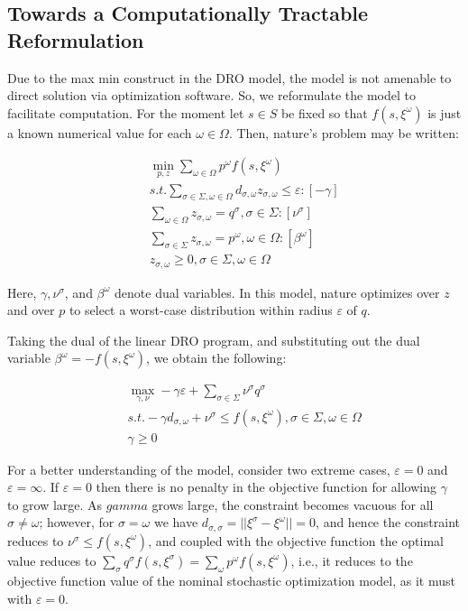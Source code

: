 \subsection{Towards a Computationally Tractable Reformulation}
\label{subsec:TractableReformulation}
Due to the max min construct in the DRO model, the model is not amenable to direct solution
via optimization software. So, we reformulate the model to facilitate computation.
For the moment let $s\in S$ be fixed so that $f(s, \xi^\omega)$ is just a known numerical
value for each $\omega \in \Omega$. Then, nature’s problem may be written:

\begin{subequations}
\begin{eqnarray}
& & \min_{p, z} \sum_{\omega \in \Omega} p^\omega f(s, \xi^\omega) \\
& & s.t. \sum_{\sigma \in \Sigma, \omega \in \Omega} d_{\sigma, \omega} z_{\sigma, \omega} \le \varepsilon : [-\gamma] \\
& & \sum_{\omega \in \Omega} z_{\sigma, \omega} = q^\sigma, \sigma \in \Sigma : [\nu^\sigma]\\
& & \sum_{\sigma \in \Sigma} z_{\sigma, \omega} = p^\omega, \omega \in \Omega : [\beta^\omega]\\
& & z_{\sigma, \omega} \ge 0, \sigma \in \Sigma, \omega \in \Omega
\end{eqnarray}
\end{subequations}

Here, $\gamma, \nu^\sigma$, and $\beta^\omega$ denote dual variables.
In this model, nature optimizes over $z$ and over $p$ to select a worst-case distribution
within radius $\varepsilon$ of $q$.

Taking the dual of the linear DRO program, and substituting out the dual variable
$\beta^\omega= -f(s, \xi^\omega)$, we obtain the following:

\begin{subequations}\label{dualProlem}
\begin{eqnarray}
& & \max_{\gamma, \nu} -\gamma \varepsilon + \sum_{\sigma\in \Sigma} \nu^\sigma q^\sigma \\
& & s.t. -\gamma d_{\sigma, \omega} + \nu^\sigma \le f(s, \xi^\omega), \sigma \in \Sigma, \omega \in \Omega \\
& & \gamma \ge 0
\end{eqnarray}
\end{subequations}

For a better understanding of the model, consider two extreme cases, $\varepsilon = 0$ and $\varepsilon = \infty$.
If $\varepsilon = 0$ then there is no penalty in the objective function for allowing $\gamma$
to grow large. As $gamma$ grows large, the constraint becomes vacuous for all $\sigma \ne \omega$;
however, for $\sigma = \omega$ we have $d_{\sigma, \sigma} = ||\xi^\sigma - \xi^\omega|| = 0$,
and hence the constraint reduces to $\nu^\sigma \le f(s, \xi^\omega)$, and coupled with the objective
function the optimal value reduces to $\sum_\sigma q^\sigma f(s, \xi^\sigma) = \sum_\omega p^\omega f(s, \xi^\omega)$,
i.e., it reduces to the objective function value of the nominal stochastic optimization model,
as it must with $\varepsilon = 0$.

